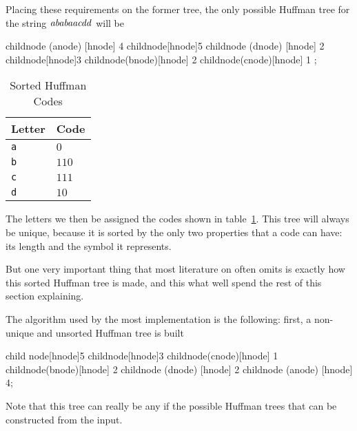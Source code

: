 Placing these requirements on the former tree, the only possible
Huffman tree for the string $\mathit{ababaacdd}$ will be

\begin{huffmanc}
  child{node (anode) [hnode] {4}}
  child{node[hnode]{5}
    child{node (dnode) [hnode] {2}}
    child{node[hnode]{3}
      child{node(bnode)[hnode] {2}}
      child{node(cnode)[hnode] {1}}
    }};

\end{huffmanc}

\begin{table}
  \centering
  \begin{tabular}{ll}
    \toprule
    Letter & Code \\
    \midrule
    \texttt{a} & $0$ \\
    \texttt{b} & $110$ \\
    \texttt{c} & $111$ \\
    \texttt{d} & $10$ \\
    \bottomrule
  \end{tabular}
  \caption{Sorted Huffman Codes}
  \label{tab:huffman-codes-sorted}
\end{table}

The letters we then be assigned the codes shown in
table~\ref{tab:huffman-codes-sorted}. This tree will always be unique,
because it is sorted by the only two properties that a code can have:
its length and the symbol it represents.

But one very important thing that most literature on  often
omits is exactly how this sorted Huffman tree is made, and this
what well spend the rest of this section explaining.

The algorithm used by the most  implementation is the
following: first, a non-unique and unsorted Huffman tree is built

\begin{huffmanc}
  child {node[hnode]{5}
    child{node[hnode]{3}
      child{node(cnode)[hnode] {1}}
      child{node(bnode)[hnode] {2}}}
    child{node (dnode) [hnode] {2}}}
  child{node (anode) [hnode] {4}};

\end{huffmanc}

Note that this tree can really be any if the possible Huffman trees that can
be constructed from the input.

